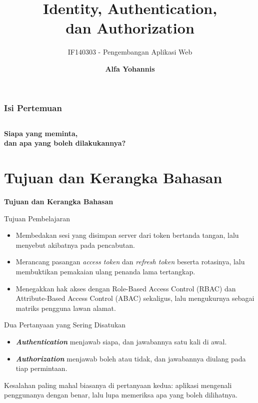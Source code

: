 \documentclass[aspectratio=169, table, 12pt]{beamer}
\title{\Huge Identity, Authentication,\\ \vspace{10pt} dan Authorization}
\subtitle{IF140303 - Pengembangan Aplikasi Web}
\author{\textbf{Alfa Yohannis}}
\begin{document}
\frame{\titlepage}

\begin{frame}[fragile]
  \frametitle{Isi Pertemuan}
  \vspace{14pt}
  \begin{columns}[t]
    {\small\tableofcontents[sections={1-7}]}

    {\small\tableofcontents[sections={8-14}]}
  \end{columns}
\end{frame}

\begin{frame}{\hfill}
  \centering
  \Huge{\textbf{Siapa yang meminta,\\dan apa yang boleh dilakukannya?}}
\end{frame}

\section{Tujuan dan Kerangka Bahasan}

\begin{frame}{\hfill}
  \centering
  \Huge{\textbf{Tujuan dan Kerangka Bahasan}}
\end{frame}

\begin{frame}{{\Large Tujuan Pembelajaran}}
  \vspace{10pt}
  \begin{itemize}
    \item Membedakan sesi yang disimpan server dari token bertanda tangan,
          lalu menyebut akibatnya pada pencabutan.
    \item Merancang pasangan \textit{access token} dan \textit{refresh
          token} beserta rotasinya, lalu membuktikan pemakaian ulang penanda
          lama tertangkap.
    \item Menegakkan hak akses dengan Role-Based Access Control (RBAC) dan Attribute-Based Access Control (ABAC) sekaligus, lalu
          mengukurnya sebagai matriks pengguna lawan alamat.
  \end{itemize}
\end{frame}

\begin{frame}{{\Large Dua Pertanyaan yang Sering Disatukan}}
  \vspace{12pt}
  \begin{itemize}
    \item \textbf{\textit{Authentication}} menjawab siapa, dan jawabannya
          satu kali di awal.
    \item \textbf{\textit{Authorization}} menjawab boleh atau tidak, dan
          jawabannya diulang pada tiap permintaan.
  \end{itemize}
  \vspace{10pt}
  {\small Kesalahan paling mahal biasanya di pertanyaan kedua: aplikasi
  mengenali penggunanya dengan benar, lalu lupa memeriksa apa yang boleh
  dilihatnya.}
\end{frame}
\end{document}
